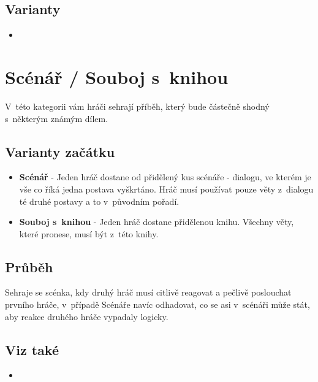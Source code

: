  
\subsection{ Varianty } \begin{itemize}
\item  {}
\end{itemize}
 
 
 
\needspace{5cm} \section{Scénář / Souboj s~knihou} \label{scénář / souboj s~knihou}  
 
 
V~této  kategorii  vám hráči sehrají příběh, který bude částečně shodný s~některým známým dílem. 
 
\subsection{Varianty začátku} \begin{itemize}
\item \textbf{Scénář} - Jeden hráč dostane od  přidělený kus scénáře - dialogu, ve kterém je vše co říká jedna postava vyškrtáno. Hráč musí používat pouze věty z~dialogu té druhé postavy a to v~původním pořadí.
\item \textbf{Souboj s~knihou} - Jeden hráč dostane přidělenou knihu.  Všechny věty, které pronese, musí být  z~této knihy.
\end{itemize}
 
\subsection{Průběh} Sehraje se scénka, kdy druhý hráč musí citlivě reagovat a pečlivě poslouchat prvního hráče, v~případě Scénáře navíc odhadovat, co se asi v~scénáři může stát, aby reakce druhého hráče vypadaly logicky. 
 
\subsection{Viz také} \begin{itemize}
\item  {}
\end{itemize}
 
 
 
